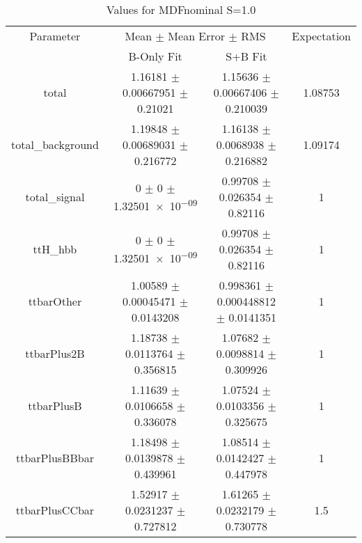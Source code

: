 \begin{table}
\centering
\caption{Values for MDFnominal S=1.0}
\begin{tabular}{cccc}
\toprule
Parameter & \multicolumn{2}{c}{Mean $\pm$ Mean Error $\pm$ RMS} & Expectation\\
 & B-Only Fit & S+B Fit & \\
\midrule
total & \num{1.16181} $\pm$ \num{0.00667951} $\pm$ \num{0.21021} & \num{1.15636} $\pm$ \num{0.00667406} $\pm$ \num{0.210039} & \num{1.08753}\\
total\_background & \num{1.19848} $\pm$ \num{0.00689031} $\pm$ \num{0.216772} & \num{1.16138} $\pm$ \num{0.0068938} $\pm$ \num{0.216882} & \num{1.09174}\\
total\_signal & \num{0} $\pm$ \num{0} $\pm$ \num{1.32501e-09} & \num{0.99708} $\pm$ \num{0.026354} $\pm$ \num{0.82116} & \num{1}\\
ttH\_hbb & \num{0} $\pm$ \num{0} $\pm$ \num{1.32501e-09} & \num{0.99708} $\pm$ \num{0.026354} $\pm$ \num{0.82116} & \num{1}\\
ttbarOther & \num{1.00589} $\pm$ \num{0.00045471} $\pm$ \num{0.0143208} & \num{0.998361} $\pm$ \num{0.000448812} $\pm$ \num{0.0141351} & \num{1}\\
ttbarPlus2B & \num{1.18738} $\pm$ \num{0.0113764} $\pm$ \num{0.356815} & \num{1.07682} $\pm$ \num{0.0098814} $\pm$ \num{0.309926} & \num{1}\\
ttbarPlusB & \num{1.11639} $\pm$ \num{0.0106658} $\pm$ \num{0.336078} & \num{1.07524} $\pm$ \num{0.0103356} $\pm$ \num{0.325675} & \num{1}\\
ttbarPlusBBbar & \num{1.18498} $\pm$ \num{0.0139878} $\pm$ \num{0.439961} & \num{1.08514} $\pm$ \num{0.0142427} $\pm$ \num{0.447978} & \num{1}\\
ttbarPlusCCbar & \num{1.52917} $\pm$ \num{0.0231237} $\pm$ \num{0.727812} & \num{1.61265} $\pm$ \num{0.0232179} $\pm$ \num{0.730778} & \num{1.5}\\
\bottomrule
\end{tabular}
\end{table}